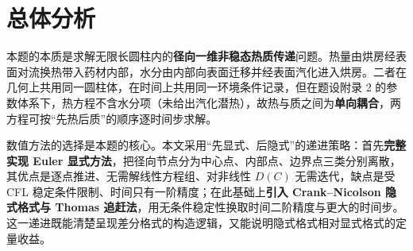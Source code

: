 \section{总体分析}
本题的本质是求解无限长圆柱内的\textbf{径向一维非稳态热质传递}问题。热量由烘房经表面对流换热带入药材内部，水分由内部向表面迁移并经表面汽化进入烘房。二者在几何上共用同一圆柱体，在时间上共用同一环境条件记录，但在题设附录 2 的参数体系下，热方程不含水分项（未给出汽化潜热），故热与质之间为\textbf{单向耦合}，两方程可按“先热后质”的顺序逐时间步求解。

数值方法的选择是本题的核心。本文采用“先显式、后隐式”的递进策略：首先\textbf{完整实现 Euler 显式方法}，把径向节点分为中心点、内部点、边界点三类分别离散，其优点是逐点推进、无需解线性方程组、对非线性 $D(C)$ 无需迭代，缺点是受 CFL 稳定条件限制、时间只有一阶精度；在此基础上\textbf{引入 Crank--Nicolson 隐式格式与 Thomas 追赶法}，用无条件稳定性换取时间二阶精度与更大的时间步。这一递进既能清楚呈现差分格式的构造逻辑，又能说明隐式格式相对显式格式的定量收益。
